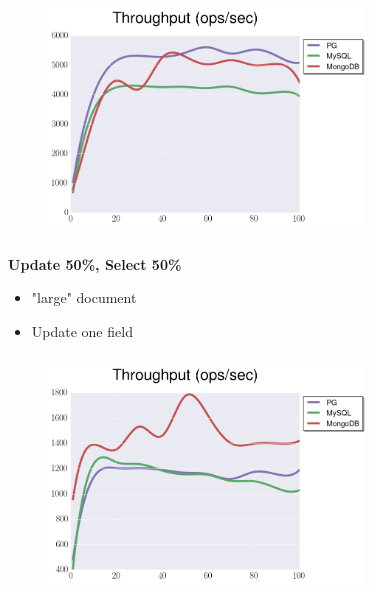 \documentclass[usenames,dvipsnames, 18pt, compress, aspectratio=169]{beamer}
\begin{document}
\begin{frame}
    \frametitle{}
    \begin{center}
    \begin{figure}
        \includegraphics[width=0.75\textwidth,center]{benchmarks/update_btree_journaled_throughput.png}
    \end{figure}
    \end{center}
\end{frame}

\begin{frame}
    \frametitle{}
    \begin{center}
        \textbf{Update 50\%, Select 50\%}
        \begin{itemize}[label={}]
            \item "large" document
            \item Update one field
        \end{itemize}
    \end{center}
\end{frame}

\begin{frame}
    \frametitle{}
    \begin{center}
    \begin{figure}
        \includegraphics[width=0.75\textwidth,center]{benchmarks/update_btree_large_throughput.png}
    \end{figure}
    \end{center}
\end{frame}
\end{document}
